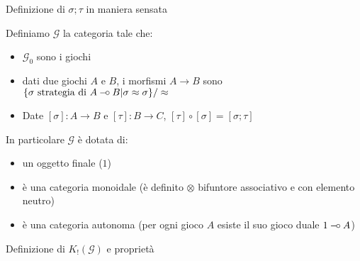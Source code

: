 \documentclass{beamer}
\newcommand{\limp}{\mathbin{{-}\mkern-3.5mu{\circ}}}
\begin{document}
\begin{frame}
	
	Definizione di $\sigma ; \tau$ in maniera sensata
	
	Definiamo $\mathcal{G}$ la categoria tale che:
	\begin{itemize}
		\item $\mathcal{G}_0$ sono i giochi
		\item dati due giochi $A$ e $B$, i morfismi $A\rightarrow B$ sono $\{ \sigma \text{ strategia di } A\limp B | \sigma \approx \sigma \} / \approx$
		\item Date $[\sigma] : A\rightarrow B$ e $[\tau] : B \rightarrow C$, $[\tau] \circ [\sigma] = [\sigma ; \tau]$
	\end{itemize}
	
	In particolare $\mathcal{G}$ è dotata di:
	\begin{itemize}
		\item un oggetto finale ($1$)
		\item è una categoria monoidale (è definito $\otimes$ bifuntore associativo e con elemento neutro)
		\item è una categoria autonoma (per ogni gioco $A$ esiste il suo gioco duale $1 \limp A$)
	\end{itemize}
	
\end{frame}


\begin{frame}

	Definizione di $K_! (\mathcal{G})$ e proprietà

\end{frame}
\end{document}
